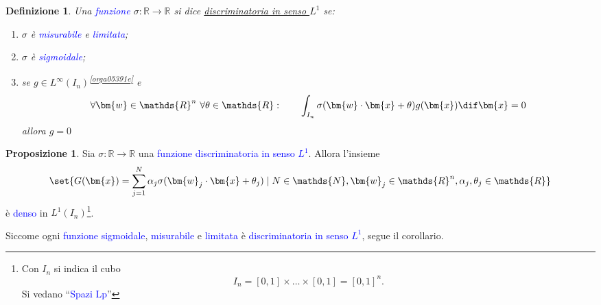 \documentclass[10pt]{book}
\newcommand{\1}{\mathds{1}}
\newcommand{\R}{\mathds{R}}
\newcommand{\N}{\mathds{N}}
\theoremstyle{definition}%
\newtheorem{prop}[thm]{Proposizione}
\theoremstyle{plain}
\newtheorem{definizione}[thm]{Definizione}
\theoremstyle{remark}
\renewcommand{\href}[2]{\textcolor{blue}{#2}}
\begin{document}
\begin{definizione}
Una \href{../../../../../org/roam/20250202170607-classe_relazione_binaria.org}{funzione} \(\sigma:\R\to \R\) si dice \uline{discriminatoria in senso \(L^{1}\)} se:
\begin{enumerate}
\item \(\sigma\) è \href{../../../../../org/roam/20250704104947-funzione_misurabile.org}{misurabile} e \href{../../../../../org/roam/20250704145518-funzione_limitata.org}{limitata};
\item \(\sigma\) è \href{../../../../../org/roam/20250625110110-funzione_sigmoidale.org}{sigmoidale};
\item se \(g \in L^{\infty}(I_{n})\)\textsuperscript{\ref{orga05391e}} e
\begin{equation*}
 \forall \bm{w} \in \R^{n}\ \forall \theta \in \R:\qquad\int_{I_{n}} \sigma(\bm{w}\cdot\bm{x} + \theta)g(\bm{x})\dif\bm{x} = 0
\end{equation*}
allora \(g=0\)
\end{enumerate}
\label{def9.3.16}
\end{definizione}

\begin{prop}
Sia \(\sigma:\R\to\R\) una \href{../../../../../org/roam/20250202170607-classe_relazione_binaria.org}{funzione} \href{../../../../../org/roam/20250625105528-funzione_discriminatoria_per_una_misura_di_baire_sul_cubo_unitario.org}{discriminatoria in senso \(L^{1}\)}. Allora l'insieme
\begin{equation*}
\set{
G(\bm{x}) = \sum_{j=1}^{N}\alpha_{j}\sigma(\bm{w}_{j}\cdot \bm{x} + \theta_{j})\mid N \in \N, \bm{w}_{j} \in \R^{n}, \alpha_{j},\theta_{j} \in \R
}
\end{equation*}
è \href{../../../../../org/roam/20250301193045-sottoinsieme_denso.org}{denso} in \(L^{1}(I_{n})\)\footnote{Con \(I_{n}\) si indica il cubo
\begin{equation*}
I_{n} = [0,1]\times \dots \times [0,1] = [0,1]^{n}.
\end{equation*}
Si vedano ``\href{../../../../../org/roam/20250624162220-spazi_lp.org}{Spazi Lp}''\label{org21e2190}}.
\label{prop9.3.17}
\end{prop}

Siccome ogni \href{../../../../../org/roam/20250202170607-classe_relazione_binaria.org}{funzione} \href{../../../../../org/roam/20250625110110-funzione_sigmoidale.org}{sigmoidale}, \href{../../../../../org/roam/20250704104947-funzione_misurabile.org}{misurabile} e \href{../../../../../org/roam/20250704145518-funzione_limitata.org}{limitata} è \href{../../../../../org/roam/20250625105528-funzione_discriminatoria_per_una_misura_di_baire_sul_cubo_unitario.org}{discriminatoria in senso \(L^{1}\)}, segue il corollario.
\end{document}
